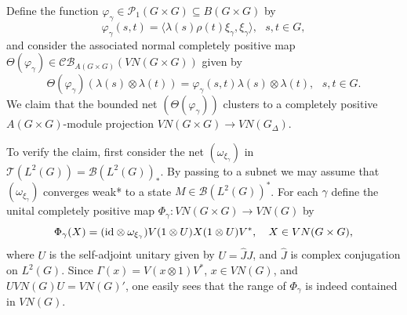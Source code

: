 \documentclass[preprint,12pt]{elsarticle}
\newcommand{\mc}[1]{\mathcal{#1}}
\newcommand{\la}{\langle}
\newcommand{\ra}{\rangle}
\newcommand{\LT}{L^2(G)}
\newcommand{\BLT}{\mc{B}(L^2(G))}
\newcommand{\TC}{\mc{T}(L^2(G))}
\newcommand{\vphi}{\varphi}
\newcommand{\lm}{\lambda}
\newcommand{\Gam}{\Gamma}
\newcommand{\om}{\omega}
\newcommand{\ten}{\otimes}
\newcommand{\id}{\textnormal{id}}
\newcommand{\h}[1]{\widehat{#1}}
\begin{document}
\begin{pf}
Define the function $\vphi_\gamma\in\mc{P}_1(G\times G)\subseteq B(G\times G)$ by
$$\vphi_\gamma(s,t)=\la\lm(s)\rho(t)\xi_\gamma,\xi_\gamma\ra, \ \ \ s,t\in G,$$
and consider the associated normal completely positive map $\Theta(\vphi_\gamma)\in\mc{CB}_{A(G\times G)}(VN(G\times G))$ given by
$$\Theta(\vphi_\gamma)(\lm(s)\ten\lm(t))=\vphi_\gamma(s,t)\lm(s)\ten\lm(t), \ \ \ s,t\in G.$$
We claim that the bounded net $(\Theta(\vphi_\gamma))$ clusters to a completely positive $A(G\times G)$-module projection $VN(G\times G)\rightarrow VN(G_\Delta)$.

To verify the claim, first consider the net $(\om_{\xi_\gamma})$ in $\TC=\BLT_*$. By passing to a subnet we may assume that $(\om_{\xi_\gamma})$ converges weak* to a state $M\in\BLT^*$. For each $\gamma$ define the unital completely positive map $\Phi_\gamma:VN(G\times G)\rightarrow VN(G)$ by
$$\Phi_\gamma(X)=(\id\ten\om_{\xi_\gamma})V(1\ten U)X(1\ten U)V^*, \ \ \ X\in VN(G\times G),$$
where $U$ is the self-adjoint unitary given by $U=\h{J}J$, and $\h{J}$ is complex conjugation on $\LT$. Since $\Gam(x)=V(x\ten 1)V^*$, $x\in VN(G)$, and $UVN(G)U=VN(G)'$, one easily sees that the range of $\Phi_\gamma$ is indeed contained in $VN(G)$.


\end{pf}
\end{document}
